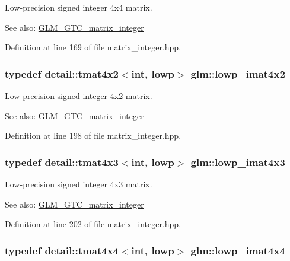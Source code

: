 Low-precision signed integer 4x4 matrix. \begin{Desc}
\item[See also:]\hyperlink{group__gtc__matrix__integer}{GLM\_\-GTC\_\-matrix\_\-integer} \end{Desc}


Definition at line 169 of file matrix\_\-integer.hpp.\hypertarget{group__gtc__matrix__integer_g0d7055814ab969df3b844ba9c52dbf61}{
\subsubsection[lowp\_\-imat4x2]{\setlength{\rightskip}{0pt plus 5cm}typedef detail::tmat4x2$<$int, lowp$>$ {\bf glm::lowp\_\-imat4x2}}}
\label{group__gtc__matrix__integer_g0d7055814ab969df3b844ba9c52dbf61}


Low-precision signed integer 4x2 matrix. \begin{Desc}
\item[See also:]\hyperlink{group__gtc__matrix__integer}{GLM\_\-GTC\_\-matrix\_\-integer} \end{Desc}


Definition at line 198 of file matrix\_\-integer.hpp.\hypertarget{group__gtc__matrix__integer_g73858cf965b0aa7e72908eb817c192d6}{
\subsubsection[lowp\_\-imat4x3]{\setlength{\rightskip}{0pt plus 5cm}typedef detail::tmat4x3$<$int, lowp$>$ {\bf glm::lowp\_\-imat4x3}}}
\label{group__gtc__matrix__integer_g73858cf965b0aa7e72908eb817c192d6}


Low-precision signed integer 4x3 matrix. \begin{Desc}
\item[See also:]\hyperlink{group__gtc__matrix__integer}{GLM\_\-GTC\_\-matrix\_\-integer} \end{Desc}


Definition at line 202 of file matrix\_\-integer.hpp.\hypertarget{group__gtc__matrix__integer_g92339a0b053a721e3b88267e6d175014}{
\subsubsection[lowp\_\-imat4x4]{\setlength{\rightskip}{0pt plus 5cm}typedef detail::tmat4x4$<$int, lowp$>$ {\bf glm::lowp\_\-imat4x4}}}
\label{group__gtc__matrix__integer_g92339a0b053a721e3b88267e6d175014}


